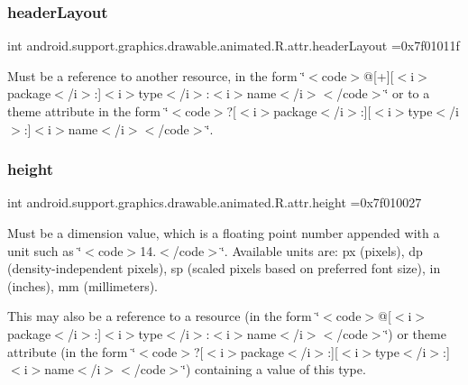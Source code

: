 \subsubsection{\texorpdfstring{header\+Layout}{headerLayout}}
{\footnotesize\ttfamily int android.\+support.\+graphics.\+drawable.\+animated.\+R.\+attr.\+header\+Layout =0x7f01011f\hspace{0.3cm}{\ttfamily [static]}}

Must be a reference to another resource, in the form \char`\"{}$<$code$>$@\mbox{[}+\mbox{]}\mbox{[}$<$i$>$package$<$/i$>$\+:\mbox{]}$<$i$>$type$<$/i$>$\+:$<$i$>$name$<$/i$>$$<$/code$>$\char`\"{} or to a theme attribute in the form \char`\"{}$<$code$>$?\mbox{[}$<$i$>$package$<$/i$>$\+:\mbox{]}\mbox{[}$<$i$>$type$<$/i$>$\+:\mbox{]}$<$i$>$name$<$/i$>$$<$/code$>$\char`\"{}. \mbox{\label{classandroid_1_1support_1_1graphics_1_1drawable_1_1animated_1_1R_1_1attr_a549b8f423d52bdd3f24e190ac8720092}} 
\subsubsection{\texorpdfstring{height}{height}}
{\footnotesize\ttfamily int android.\+support.\+graphics.\+drawable.\+animated.\+R.\+attr.\+height =0x7f010027\hspace{0.3cm}{\ttfamily [static]}}

Must be a dimension value, which is a floating point number appended with a unit such as \char`\"{}$<$code$>$14.\+5sp$<$/code$>$\char`\"{}. Available units are\+: px (pixels), dp (density-\/independent pixels), sp (scaled pixels based on preferred font size), in (inches), mm (millimeters). 

This may also be a reference to a resource (in the form \char`\"{}$<$code$>$@\mbox{[}$<$i$>$package$<$/i$>$\+:\mbox{]}$<$i$>$type$<$/i$>$\+:$<$i$>$name$<$/i$>$$<$/code$>$\char`\"{}) or theme attribute (in the form \char`\"{}$<$code$>$?\mbox{[}$<$i$>$package$<$/i$>$\+:\mbox{]}\mbox{[}$<$i$>$type$<$/i$>$\+:\mbox{]}$<$i$>$name$<$/i$>$$<$/code$>$\char`\"{}) containing a value of this type. \mbox{\label{classandroid_1_1support_1_1graphics_1_1drawable_1_1animated_1_1R_1_1attr_a2f80718ea85da01121e1763dfd22caef}} 
